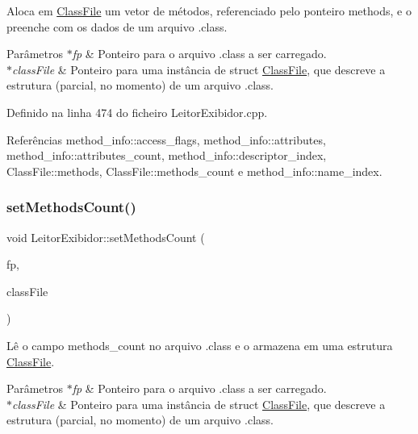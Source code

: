 Aloca em \hyperlink{classClassFile}{Class\+File} um vetor de métodos, referenciado pelo ponteiro methods, e o preenche com os dados de um arquivo .class. 
\begin{DoxyParams}{Parâmetros}
{\em $\ast$fp} & Ponteiro para o arquivo .class a ser carregado. \\
\hline
{\em $\ast$class\+File} & Ponteiro para uma instância de struct \hyperlink{classClassFile}{Class\+File}, que descreve a estrutura (parcial, no momento) de um arquivo .class. \\
\hline
\end{DoxyParams}


Definido na linha 474 do ficheiro Leitor\+Exibidor.\+cpp.



Referências method\+\_\+info\+::access\+\_\+flags, method\+\_\+info\+::attributes, method\+\_\+info\+::attributes\+\_\+count, method\+\_\+info\+::descriptor\+\_\+index, Class\+File\+::methods, Class\+File\+::methods\+\_\+count e method\+\_\+info\+::name\+\_\+index.

\mbox{\label{classLeitorExibidor_a6292517ec3beae1ef6ff67678110e961}} 
\subsubsection{\texorpdfstring{set\+Methods\+Count()}{setMethodsCount()}}
{\footnotesize\ttfamily void Leitor\+Exibidor\+::set\+Methods\+Count (\begin{DoxyParamCaption}\item[{F\+I\+LE $\ast$}]{fp,  }\item[{\hyperlink{classClassFile}{Class\+File} $\ast$}]{class\+File }\end{DoxyParamCaption})\hspace{0.3cm}{\ttfamily [private]}}

Lê o campo methods\+\_\+count no arquivo .class e o armazena em uma estrutura \hyperlink{classClassFile}{Class\+File}. 
\begin{DoxyParams}{Parâmetros}
{\em $\ast$fp} & Ponteiro para o arquivo .class a ser carregado. \\
\hline
{\em $\ast$class\+File} & Ponteiro para uma instância de struct \hyperlink{classClassFile}{Class\+File}, que descreve a estrutura (parcial, no momento) de um arquivo .class. \\
\hline
\end{DoxyParams}


